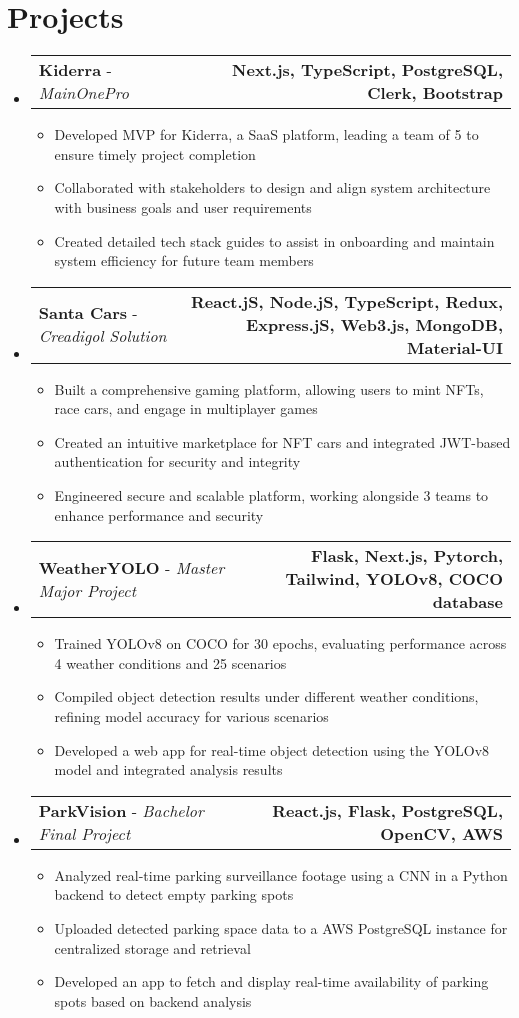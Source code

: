 \documentclass[letterpaper,11pt]{article}
\makeatletter
\newcommand{\resumeItem}[1]{
  \item\small{
    {#1 \vspace{-2pt}}
  }
}
\newcommand{\resumeProjectHeading}[2]{
    \item
    \begin{tabular*}{1.001\textwidth}{l@{\extracolsep{\fill}}r}
      \small#1 & \textbf{\small #2}\\
    \end{tabular*}\vspace{-7pt}
}
\newcommand{\resumeSubHeadingListStart}{\begin{itemize}[leftmargin=0.0in, label={}]}
\newcommand{\resumeSubHeadingListEnd}{\end{itemize}}
\newcommand{\resumeItemListStart}{\begin{itemize}}
\newcommand{\resumeItemListEnd}{\end{itemize}\vspace{-5pt}}
\makeatother
\begin{document}
\section{Projects}
\vspace{-6pt}
\resumeSubHeadingListStart
    \resumeProjectHeading
        {\textbf{Kiderra} - \emph{MainOnePro}}{Next.js, TypeScript, PostgreSQL, Clerk, Bootstrap}
        \resumeItemListStart
        \resumeItem{Developed MVP for Kiderra, a SaaS platform, leading a team of 5 to ensure timely project completion}
        \resumeItem{Collaborated with stakeholders to design and align system architecture with business goals and user requirements}
        \resumeItem{Created detailed tech stack guides to assist in onboarding and maintain system efficiency for future team members}
        \resumeItemListEnd
        \vspace{-16pt}
    \resumeProjectHeading
        {\textbf{Santa Cars} - \emph{Creadigol Solution}}{React.jS, Node.jS, TypeScript, Redux, Express.jS, Web3.js, MongoDB, Material-UI}
        \resumeItemListStart
          \resumeItem{Built a comprehensive gaming platform, allowing users to mint NFTs, race cars, and engage in multiplayer games}
          \resumeItem{Created an intuitive marketplace for NFT cars and integrated JWT-based authentication for security and integrity}
          \resumeItem{Engineered secure and scalable platform, working alongside 3 teams to enhance performance and security}
        \resumeItemListEnd
        \vspace{-16pt}
    \resumeProjectHeading
        {\textbf{WeatherYOLO} - \emph{Master Major Project}}{Flask, Next.js, Pytorch, Tailwind, YOLOv8, COCO database}
        \resumeItemListStart
          \resumeItem{Trained YOLOv8 on COCO for 30 epochs, evaluating performance across 4 weather conditions and 25 scenarios}
          \resumeItem{Compiled object detection results under different weather conditions, refining model accuracy for various scenarios}
          \resumeItem{Developed a web app for real-time object detection using the YOLOv8 model and integrated analysis results}
        \resumeItemListEnd
        \vspace{-16pt}
    \resumeProjectHeading
        {\textbf{ParkVision} - \emph{Bachelor Final Project}}{React.js, Flask, PostgreSQL, OpenCV, AWS}
        \resumeItemListStart
          \resumeItem{Analyzed real-time parking surveillance footage using a CNN in a Python backend to detect empty parking spots}
          \resumeItem{Uploaded detected parking space data to a AWS PostgreSQL instance for centralized storage and retrieval}
          \resumeItem{Developed an app to fetch and display real-time availability of parking spots based on backend analysis}
        \resumeItemListEnd
  \resumeSubHeadingListEnd
\vspace{-15pt}
\end{document}
